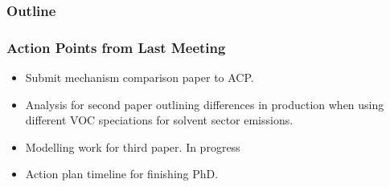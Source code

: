 \begin{frame}
    \frametitle{Outline} 
    \tableofcontents[currentsection]
\end{frame} 

\begin{frame}
    \frametitle{Action Points from Last Meeting}

    \vspace{-4mm}
    \begin{itemize}
        \item Submit mechanism comparison paper to ACP. \Checkmark \vspace{3mm}
        \item Analysis for second paper outlining differences in  production when using different VOC speciations for solvent sector emissions. \Checkmark \vspace{3mm}
        \item Modelling work for third paper. \alert{In progress} \vspace{3mm}
        \item Action plan timeline for finishing PhD. \Checkmark
    \end{itemize} 
\end{frame} 
